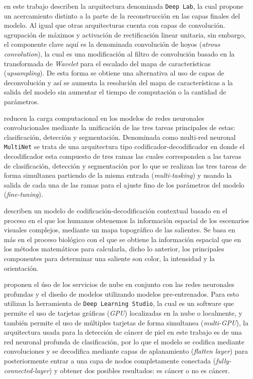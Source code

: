 \citet{DBLP:journals/corr/ChenPK0Y16} en este trabajo describen la arquitectura denominada \texttt{Deep Lab}, la cual propone un acercamiento distinto a la parte de la reconstrucción en las capas finales del modelo. Al igual que otras arquitecturas cuenta con capas de convolución. agrupación de máximos y activación de rectificación linear unitaria, sin embargo, el componente clave aquí es la denominada convolución de hoyos (\emph{atrous convolution}), la cual es una modificación al filtro de convolución basado en la transformada de \emph{Wavelet} para el escalado del mapa de características (\emph{upsampling}). De esta forma se obtiene una alternativa al uso de capas de deconvolución y así se aumenta la resolución del mapa de características a la salida del modelo sin aumentar el tiempo de computación o la cantidad de parámetros.

\citet{DBLP:journals/corr/TeichmannWZCU16} reducen la carga computacional en los modelos de redes neuronales convolucionales mediante la unificación de las tres tareas principales de estas: clasificación, detección y segmentación. Denominada como multi-red neuronal \texttt{MultiNet} se trata de una arquitectura tipo codificador-decodificador en donde el decodificador esta compuesto de tres ramas las cuales corresponden a las tareas de clasificación, detección y segmentación por lo que se realizan las tres tareas de forma simultanea partiendo de la misma entrada (\emph{multi-tasking}) y usando la salida de cada una de las ramas para el ajuste fino de los parámetros del modelo (\emph{fine-tuning}).  

\citet{KRONER2020261} describen un modelo de codificación-decodificación contextual basado en el proceso en el que los humanos obtenemos la información espacial de los escenarios visuales complejos, mediante un mapa topográfico de las salientes. Se basa en más en el proceso biológico con el que se obtiene la información espacial que en los métodos matemáticos para calcularla, dicho lo anterior, los principales componentes para determinar una saliente son color, la intensidad y la orientación.  

\citet{KADAMPUR2020100282} proponen el úso de los servicios de nube en conjunto con las redes neuronales profundas y el diseño de modelos utilizando modelos pre-entrenados. Para esto utilizan la herramienta de \texttt{Deep Learning Studio}, la cual es un software que permite el uso de tarjetas gráficas (\emph{GPU}) localizadas en la nube o localmente, y también permite el uso de múltiples tarjetas de forma simultanea (\emph{multi-GPU}), la arquitectura usada para la detección de cáncer de piel en este trabajo es de una red neuronal profunda de clasificación, por lo que el modelo se codifica mediante convoluciones y se decodifica mediante capas de aplanamiento (\emph{flatten layer}) para posteriormente entrar a una capa de nodos completamente conectada (\emph{fully-connected-layer}) y obtener dos posibles resultados: es cáncer o no es cáncer.

